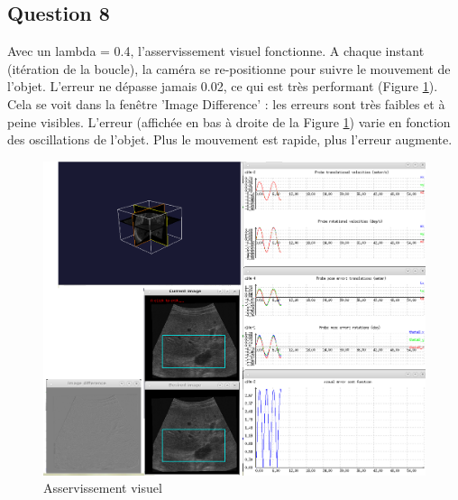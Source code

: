 \documentclass[a4paper,11pt]{article}
\begin{document}
\subsection{Question 8}
Avec un lambda = 0.4, l'asservissement visuel fonctionne. A chaque instant (it\'eration de la boucle), la cam\'era se re-positionne pour suivre le mouvement de l'objet. L'erreur ne d\'epasse jamais 0.02, ce qui est tr\`es performant (Figure \ref{assertVisu}). Cela se voit dans la fen\^etre 'Image Difference' : les erreurs sont tr\`es faibles et \`a peine visibles. L'erreur (affich\'ee en bas \`a droite de la Figure \ref{assertVisu}) varie en fonction des oscillations de l'objet. Plus le mouvement est rapide, plus l'erreur augmente.
\begin{figure}[H]
    \centering
    \includegraphics[width=1.0\textwidth]{./images/q8.png}
    \caption{Asservissement visuel}
    \label{assertVisu}
\end{figure}
\end{document}
